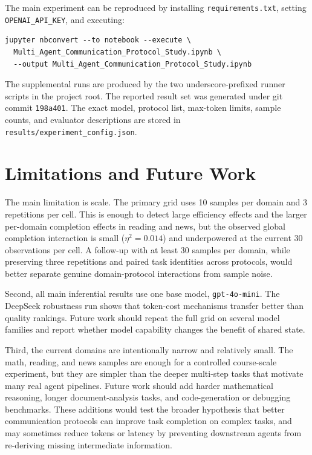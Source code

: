 \documentclass[11pt]{article}
\begin{document}
The main experiment can be reproduced by installing \texttt{requirements.txt}, setting \texttt{OPENAI\_API\_KEY}, and executing:

\begin{verbatim}
jupyter nbconvert --to notebook --execute \
  Multi_Agent_Communication_Protocol_Study.ipynb \
  --output Multi_Agent_Communication_Protocol_Study.ipynb
\end{verbatim}

The supplemental runs are produced by the two underscore-prefixed runner scripts in the project root. The reported result set was generated under git commit \texttt{198a401}. The exact model, protocol list, max-token limits, sample counts, and evaluator descriptions are stored in \texttt{results/experiment\_config.json}.

\section{Limitations and Future Work}

The main limitation is scale. The primary grid uses 10 samples per domain and 3 repetitions per cell. This is enough to detect large efficiency effects and the larger per-domain completion effects in reading and news, but the observed global completion interaction is small ($\eta^2=0.014$) and underpowered at the current 30 observations per cell. A follow-up with at least 30 samples per domain, while preserving three repetitions and paired task identities across protocols, would better separate genuine domain-protocol interactions from sample noise.

Second, all main inferential results use one base model, \texttt{gpt-4o-mini}. The DeepSeek robustness run shows that token-cost mechanisms transfer better than quality rankings. Future work should repeat the full grid on several model families and report whether model capability changes the benefit of shared state.

Third, the current domains are intentionally narrow and relatively small. The math, reading, and news samples are enough for a controlled course-scale experiment, but they are simpler than the deeper multi-step tasks that motivate many real agent pipelines. Future work should add harder mathematical reasoning, longer document-analysis tasks, and code-generation or debugging benchmarks. These additions would test the broader hypothesis that better communication protocols can improve task completion on complex tasks, and may sometimes reduce tokens or latency by preventing downstream agents from re-deriving missing intermediate information.
\end{document}
